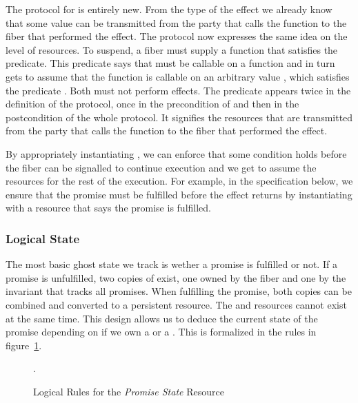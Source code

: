 The protocol for \esuspend{} is entirely new.
From the type of the \esuspend{} effect we already know that some value can be transmitted from the party that calls the  function to the fiber that performed the effect.
The protocol now expresses the same idea on the level of resources.
To suspend, a fiber must supply a function  that satisfies the \isreg{} predicate.
This predicate says that  must be callable on a  function and in turn gets to assume that the  function is callable on an arbitrary value , which satisfies the predicate .
Both must not perform effects.
The predicate  appears twice in the definition of the protocol, once in the precondition of  and then in the postcondition of the whole protocol.
It signifies the resources that are transmitted from the party that calls the  function to the fiber that performed the effect.

By appropriately instantiating , we can enforce that some condition holds before the fiber can be signalled to continue execution and we get to assume the resources  for the rest of the execution.
For example, in the  specification below, we ensure that the promise must be fulfilled before the effect returns by instantiating  with a resource that says the promise is fulfilled.

\subsubsection{Logical State}
\label{sec:sched-spec-state}

The most basic ghost state we track is wether a promise is fulfilled or not.
If a promise  is unfulfilled, two copies of \gspwait{} exist, one owned by the fiber and one by the invariant that tracks all promises.
When fulfilling the promise, both copies can be combined and converted to a persistent \gspdone{} resource.
The \gspwait{} and \gspdone{} resources cannot exist at the same time.
This design allows us to deduce the current state of the promise depending on if we own a \gspwait{} or a \gspdone{}.
This is formalized in the rules in figure~\ref{fig:promise-state-rules}.

\begin{figure}
  \caption{Logical Rules for the \textit{Promise State} Resource}.
  \label{fig:promise-state-rules}
\end{figure}

